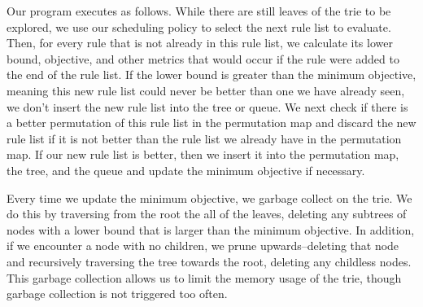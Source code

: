 \documentclass[sigconf]{acmart}
\begin{document}
Our program executes as follows. While there are still leaves of the trie to be explored, we use our scheduling policy to select the next rule list to evaluate. Then, for every rule that is not already in this rule list, we calculate its lower bound, objective, and other metrics that would occur if the rule were added to the end of the rule list. If the lower bound is greater than the minimum objective, meaning this new rule list could never be better than one we have already seen, we don't insert the new rule list into the tree or queue. We next check if there is a better permutation of this rule list in the permutation map and discard the new rule list if it is not better than the rule list we already have in the permutation map. If our new rule list is better, then we insert it into the permutation map, the tree, and the queue and update the minimum objective if necessary.

Every time we update the minimum objective, we garbage collect on the trie. We do this by traversing from the root the all of the leaves, deleting any subtrees of nodes with a lower bound that is larger than the minimum objective. In addition, if we encounter a node with no children, we prune upwards--deleting that node and recursively traversing the tree towards the root, deleting any childless nodes. This garbage collection allows us to limit the memory usage of the trie, though garbage collection is not triggered too often.

%


 
\end{document}
